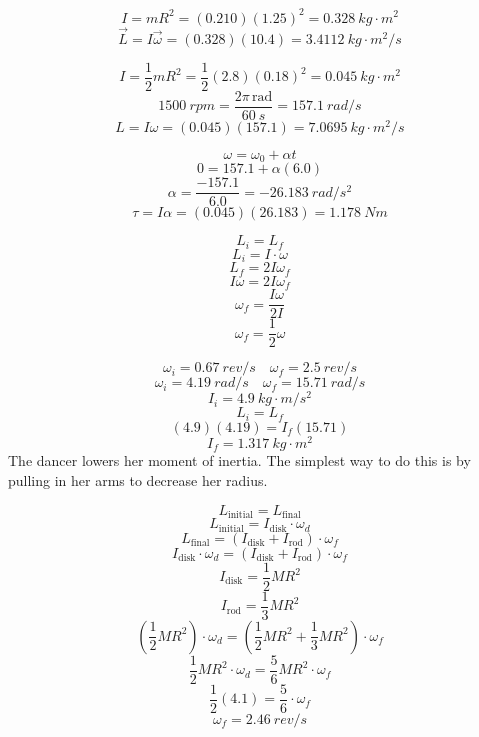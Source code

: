 \documentclass[11pt]{homework}
\begin{document}
\maketitle

\renewcommand{\questiontype}{Problem}
\setcounter{questionCounter}{0}

\question
\[
    I=mR^2 = (0.210)(1.25)^2 = \qty{0.328}{kg \cdot m^2}
\]
\[
\vec{L}=I\vec{\omega} = (0.328)(10.4) = \boxed{\qty{3.4112}{kg \cdot m^2 /s}}
\]




\question
\begin{alphaparts}
\questionpart
\[
I = \frac{1}{2}mR^2 = \frac{1}{2}(2.8)(0.18)^2 = \qty{0.045}{kg \cdot m^2}
\]
\[
    \qty{1500}{rpm} = \frac{2\pi\,\text{rad}}{\qty{60}{s}}=\qty{157.1}{rad /s}
\]
\[
L = I\omega = (0.045)(157.1) = \boxed{\qty{7.0695}{kg \cdot m^2 /s}}
\]

\questionpart
\[
\omega=\omega_{0}+\alpha t
\]
\[
0 = 157.1 + \alpha (6.0)
\]
\[
\alpha = \frac{-157.1}{6.0} = \qty{-26.183}{rad /s^2}
\]
\[
\tau = I\alpha = (0.045)(26.183) = \boxed{\qty{1.178}{Nm}}
\]

\end{alphaparts}


\question
\[
L_i = L_f
\]
\[
L_i = I \cdot \omega
\]
\[
L_f=2I \omega_f
\]
\[
I \omega = 2 I \omega_f
\]
\[
\omega_f = \frac{I\omega}{2I}
\]
\[
\boxed{\omega_f = \frac{1}{2}\omega}
\]



\setcounter{questionCounter}{4}
\question
\[
\omega_i = \qty{0.67}{rev /s} \quad \omega_f=\qty{2.5}{rev /s}
\]
\[
\omega_i = \qty{4.19}{rad /s} \quad \omega_f=\qty{15.71}{rad /s}
\]
\[
I_i = \qty{4.9}{kg \cdot m /s^2}
\]
\[
L_i = L_f
\]
\[
(4.9)(4.19) = I_f(15.71)
\]
\[
I_f = \boxed{\qty{1.317}{kg \cdot m^2}}
\]
The dancer lowers her moment of inertia. The simplest way to do this is by pulling in her arms to decrease her radius.

\setcounter{questionCounter}{8}
\question
\[
L_{\text{initial}} = L_{\text{final}}
\]
\[
L_{\text{initial}} = I_{\text{disk}} \cdot \omega_d
\]
\[
L_{\text{final}} = \left( I_{\text{disk}} + I_{\text{rod}} \right) \cdot \omega_f
\]
\[
I_{\text{disk}} \cdot \omega_d = \left( I_{\text{disk}} + I_{\text{rod}} \right) \cdot \omega_f
\]
\[
I_{\text{disk}} = \frac{1}{2} M R^2
\]
\[
I_{\text{rod}} = \frac{1}{3} M R^2
\]
\[
\left( \frac{1}{2} M R^2 \right) \cdot \omega_d = \left( \frac{1}{2} M R^2 + \frac{1}{3} M R^2 \right) \cdot \omega_f
\]
\[
\frac{1}{2} M R^2 \cdot \omega_d = \frac{5}{6} M R^2 \cdot \omega_f
\]
\[
\frac{1}{2}(4.1) = \frac{5}{6} \cdot \omega_f
\]
\[
\omega_f = \boxed{\qty{2.46}{rev /s}}
\]
\end{document}
